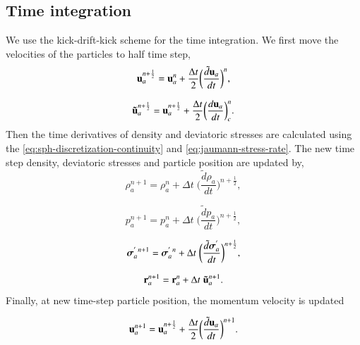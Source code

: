 \subsection{Time integration}

We use the kick-drift-kick scheme for the time integration. We first move the
velocities of the particles to half time step,
\begin{equation}
  \label{eq:velocity-update-stage-1}
  \mathbf{u}_a^{n+\frac{1}{2}} = \mathbf{u}_a^{n} + \frac{\Delta t}{2} \bigg(\frac{\tilde{d}\mathbf{u}_{a}}{dt}\bigg)^n,
\end{equation}

\begin{equation}
  \label{eq:velocity-hat-update-stage-1}
  \mathbf{\tilde{u}}_a^{n+\frac{1}{2}} = \mathbf{u}_a^{n+\frac{1}{2}} + \frac{\Delta t}{2} \bigg(\frac{d\mathbf{u}_{a}}{dt}\bigg)^{n}_{c}.
\end{equation}
%
Then the time derivatives of density and deviatoric stresses are calculated
using the \cref{eq:sph-discretization-continuity} and
\cref{eq:jaumann-stress-rate}. The new time step density, deviatoric stresses
and particle position are updated by,
\begin{equation}
  \label{eq:density-update-stage-2}
  \rho_{a}^{n+1} = \rho_{a}^{n} + \Delta t \; \bigg(\frac{\tilde{d}\rho_{a}}{dt}\bigg)^{n+\frac{1}{2}},
\end{equation}

\begin{equation}
  \label{eq:pressure-update-stage-2}
  p_{a}^{n+1} = p_{a}^{n} + \Delta t \; \bigg(\frac{\tilde{d}p_{a}}{dt}\bigg)^{n+\frac{1}{2}},
\end{equation}

\begin{equation}
  \label{eq:stress-update-stage-2}
  \boldsymbol{\sigma}_{a}^{' \; n+1} = \boldsymbol{\sigma}_{a}^{' \; n} +
  \Delta t \; \bigg(\frac{\tilde{d}\boldsymbol{\sigma}^{'}_{a}}{dt}\bigg)^{n+\frac{1}{2}},
\end{equation}

\begin{equation}
  \label{eq:position-update-stage-2}
  \mathbf{r}_{a}^{n+1} = \mathbf{r}_{a}^{n} + \Delta t \; \mathbf{\tilde{u}}_{a}^{n+1}.
\end{equation}
%
Finally, at new time-step particle position, the momentum velocity is updated

\begin{equation}
  \label{eq:velocity-update-stage-3}
  \mathbf{u}_a^{n+1} = \mathbf{u}_a^{n+\frac{1}{2}} + \frac{\Delta t}{2} \bigg(\frac{\tilde{d}\mathbf{u}_{a}}{dt}\bigg)^{n+1}.
\end{equation}


